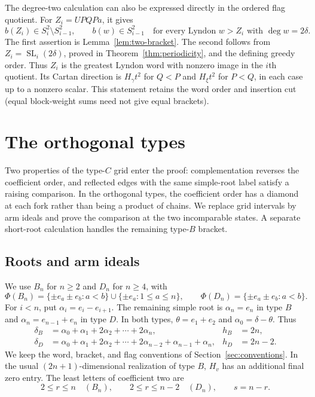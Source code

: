 \documentclass[11pt]{amsart}
\numberwithin{equation}{section}
\theoremstyle{definition}
\DeclareMathOperator{\SL}{SL}
\newcommand{\br}[1]{b(#1)}
\begin{document}
The degree-two calculation can also be expressed directly in the ordered flag quotient. For $Z_i=UPQPa$, it gives
\begin{equation}\label{eq:filtered}
 \br{Z_i}\in S_i^2\setminus S_{i-1}^2,
 \qquad
 \br{w}\in S_{i-1}^2
 \quad\text{for every Lyndon $w>Z_i$ with $\deg w=2\delta$}.
\end{equation}
The first assertion is Lemma~\ref{lem:two-bracket}. The second follows from $Z_i=\SL_i(2\delta)$, proved in Theorem~\ref{thm:periodicity}, and the defining greedy order. Thus $Z_i$ is the greatest Lyndon word with nonzero image in the $i$th quotient. Its Cartan direction is $H_\gamma t^2$ for $Q<P$ and $H_\xi t^2$ for $P<Q$, in each case up to a nonzero scalar. This statement retains the word order and insertion cut (equal block-weight sums need not give equal brackets).

\section{The orthogonal types}\label{sec:orthogonal}

Two properties of the type-$C$ grid enter the proof: complementation reverses the coefficient order, and reflected edges with the same simple-root label satisfy a raising comparison. In the orthogonal types, the coefficient order has a diamond at each fork rather than being a product of chains. We replace grid intervals by arm ideals and prove the comparison at the two incomparable states. A separate short-root calculation handles the remaining type-$B$ bracket.

\subsection{Roots and arm ideals}\label{subsec:orthogonal-arms}
We use $B_n$ for $n\geq2$ and $D_n$ for $n\geq4$, with
\[
 \Phi(B_n)=\{\pm e_a\pm e_b:a<b\}\cup\{\pm e_a:1\leq a\leq n\},
 \qquad
 \Phi(D_n)=\{\pm e_a\pm e_b:a<b\}.
\]
For $i<n$, put $\alpha_i=e_i-e_{i+1}$. The remaining simple root is $\alpha_n=e_n$ in type $B$ and $\alpha_n=e_{n-1}+e_n$ in type $D$. In both types, $\theta=e_1+e_2$ and $\alpha_0=\delta-\theta$. Thus
\begin{align}
 \delta_B&=\alpha_0+\alpha_1+2\alpha_2+\cdots+2\alpha_n,
 &h_B&=2n,\label{eq:B-null}\\
 \delta_D&=\alpha_0+\alpha_1+2\alpha_2+\cdots+2\alpha_{n-2}
                      +\alpha_{n-1}+\alpha_n,
 &h_D&=2n-2.\label{eq:D-null}
\end{align}
We keep the word, bracket, and flag conventions of Section~\ref{sec:conventions}. In the usual $(2n+1)$-dimensional realization of type $B$, $H_v$ has an additional final zero entry. The least letters of coefficient two are
\[
 2\leq r\leq n\quad(B_n),\qquad
 2\leq r\leq n-2\quad(D_n),
 \qquad s=n-r.
\]
\end{document}
